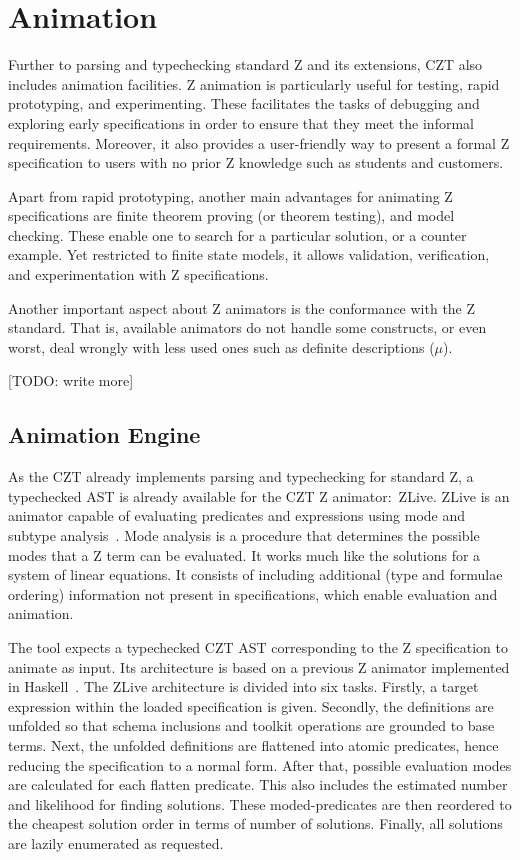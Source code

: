 \documentclass{llncs}
\begin{document}
\section{Animation}
\label{animation}

    Further to parsing and typechecking standard Z and its extensions, CZT also includes
    animation facilities. Z animation is particularly useful for testing, rapid prototyping,
    and experimenting. These facilitates the tasks of debugging and exploring early
    specifications in order to ensure that they meet the informal requirements.
    Moreover, it also provides a user-friendly way to present a formal Z specification
    to users with no prior Z knowledge such as students and customers.

    Apart from rapid prototyping, another main advantages for animating Z specifications
    are finite theorem proving (or theorem testing), and model checking.
    These enable one to search for a particular solution, or a counter example.
    Yet restricted to finite state models, it allows validation, verification, and
    experimentation with Z specifications.

    Another important aspect about Z animators is the conformance with the Z standard.
    That is, available animators do not handle some constructs, or even worst, deal
    wrongly with less used ones such as definite descriptions ($\mu$).

    [TODO: write more]

\subsection{Animation Engine}

    As the CZT already implements parsing and typechecking for standard Z,
    a typechecked AST is already available for the CZT Z animator:~ZLive.
    ZLive is an animator capable of evaluating predicates and expressions using
    mode and subtype analysis~\cite{winikooff98}.
    Mode analysis is a procedure that determines the possible modes that a
    Z term can be evaluated. It works much like the solutions for a system of linear equations.
    It consists of including additional (type and formulae ordering) information not
    present in specifications, which enable evaluation and animation.

    The tool expects a typechecked CZT AST corresponding to the Z specification to animate
    as input. Its architecture is based on a previous Z animator implemented in Haskell~\cite{utting-jaza}.
    The ZLive architecture is divided into six tasks.
    Firstly, a target expression within the loaded specification is given.
    Secondly, the definitions are unfolded so that schema inclusions and toolkit operations
    are grounded to base terms. Next, the unfolded definitions are flattened into atomic
    predicates, hence reducing the specification to a normal form.
    After that, possible evaluation modes are calculated for each flatten predicate.
    This also includes the estimated number and likelihood for finding solutions.
    These moded-predicates are then reordered to the cheapest solution order in terms of
    number of solutions. Finally, all solutions are lazily enumerated as requested.
\end{document}

